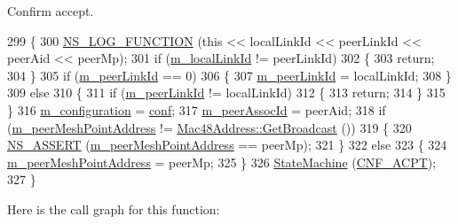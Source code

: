 Confirm accept. 


\begin{DoxyCode}
299 \{
300   \hyperlink{log-macros-disabled_8h_a90b90d5bad1f39cb1b64923ea94c0761}{NS\_LOG\_FUNCTION} (\textcolor{keyword}{this} << localLinkId << peerLinkId << peerAid << peerMp);
301   \textcolor{keywordflow}{if} (\hyperlink{classns3_1_1dot11s_1_1PeerLink_ae0647b7f17be8e5f3f721cf4c714ab81}{m\_localLinkId} != peerLinkId)
302     \{
303       \textcolor{keywordflow}{return};
304     \}
305   \textcolor{keywordflow}{if} (\hyperlink{classns3_1_1dot11s_1_1PeerLink_af620e2d2607904bc9b5d107aa1524038}{m\_peerLinkId} == 0)
306     \{
307       \hyperlink{classns3_1_1dot11s_1_1PeerLink_af620e2d2607904bc9b5d107aa1524038}{m\_peerLinkId} = localLinkId;
308     \}
309   \textcolor{keywordflow}{else}
310     \{
311       \textcolor{keywordflow}{if} (\hyperlink{classns3_1_1dot11s_1_1PeerLink_af620e2d2607904bc9b5d107aa1524038}{m\_peerLinkId} != localLinkId)
312         \{
313           \textcolor{keywordflow}{return};
314         \}
315     \}
316   \hyperlink{classns3_1_1dot11s_1_1PeerLink_ab8f2b72136504a51c86d05c1e156301e}{m\_configuration} = \hyperlink{namespaceconf}{conf};
317   \hyperlink{classns3_1_1dot11s_1_1PeerLink_a732db7f1857d5f3a56d5c5fccbe66cb4}{m\_peerAssocId} = peerAid;
318   \textcolor{keywordflow}{if} (\hyperlink{classns3_1_1dot11s_1_1PeerLink_a610c8fd3d7f1c337f912c4a95d7c3dbc}{m\_peerMeshPointAddress} != \hyperlink{classns3_1_1Mac48Address_a55156e302c6bf950c0b558365adbde84}{Mac48Address::GetBroadcast} 
      ())
319     \{
320       \hyperlink{assert_8h_a6dccdb0de9b252f60088ce281c49d052}{NS\_ASSERT} (\hyperlink{classns3_1_1dot11s_1_1PeerLink_a610c8fd3d7f1c337f912c4a95d7c3dbc}{m\_peerMeshPointAddress} == peerMp);
321     \}
322   \textcolor{keywordflow}{else}
323     \{
324       \hyperlink{classns3_1_1dot11s_1_1PeerLink_a610c8fd3d7f1c337f912c4a95d7c3dbc}{m\_peerMeshPointAddress} = peerMp;
325     \}
326   \hyperlink{classns3_1_1dot11s_1_1PeerLink_a4cc26e7fdbef0daafd1f6cc7d89fdd01}{StateMachine} (\hyperlink{classns3_1_1dot11s_1_1PeerLink_ac43c14ad12c9ea15604be0ee70ab6b90a537fe6775374b212c9307bde62892e4d}{CNF\_ACPT});
327 \}
\end{DoxyCode}


Here is the call graph for this function\+:



